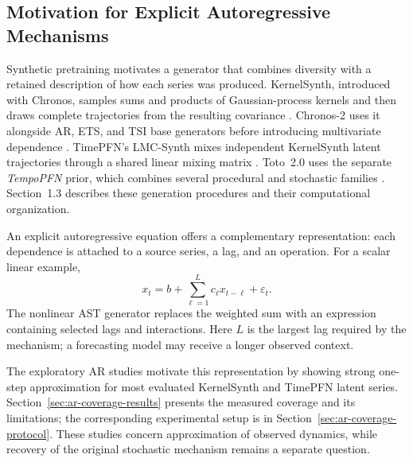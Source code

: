 \subsection{Motivation for Explicit Autoregressive Mechanisms}
\label{sec:generator-ar-motivation}

Synthetic pretraining motivates a generator that combines diversity with a
retained description of how each series was produced. KernelSynth, introduced
with Chronos, samples sums and products of Gaussian-process kernels and then
draws complete trajectories from the resulting covariance
\citep[Section~4.2]{ansari2024chronos}. Chronos-2 uses it alongside AR, ETS, and
TSI base generators before introducing multivariate dependence
\citep{ansari2025chronos2}. TimePFN's LMC-Synth mixes independent KernelSynth
latent trajectories through a shared linear mixing matrix
\citep{taga2025timepfn}. Toto~2.0 uses the separate \emph{TempoPFN} prior,
which combines several procedural and stochastic families
\citep{moroshan2025tempopfn,khwaja2026toto2}. Section~1.3 describes these
generation procedures and their computational organization.

An explicit autoregressive equation offers a complementary representation:
each dependence is attached to a source series, a lag, and an operation.
For a scalar linear example,
\begin{equation}
 x_t=b+\sum_{\ell=1}^{L}c_{\ell}x_{t-\ell}+\varepsilon_t.
 \label{eq:implemented-ar}
\end{equation}
The nonlinear AST generator replaces the weighted sum with an expression
containing selected lags and interactions. Here $L$ is the largest lag required
by the mechanism; a forecasting model may receive a longer observed context.

The exploratory AR studies motivate this representation by showing strong
one-step approximation for most evaluated KernelSynth and TimePFN latent
series. Section~\ref{sec:ar-coverage-results} presents the measured coverage
and its limitations; the corresponding experimental setup is in
Section~\ref{sec:ar-coverage-protocol}. These studies concern approximation
of observed dynamics, while recovery of the original stochastic mechanism
remains a separate question.
